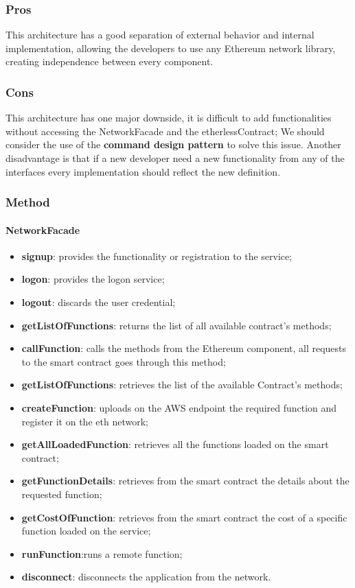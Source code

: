 \subsubsection{Pros}
This architecture has a good separation of external behavior and internal implementation,
allowing the developers to use any Ethereum network library, creating independence between every component.
\subsubsection{Cons}
This architecture has one major downside, it is difficult to add functionalities without accessing the NetworkFacade and the etherlessContract; We should consider the use of the \textbf{command design pattern} to solve this issue.
Another disadvantage is that if a new developer need a new functionality from any of the interfaces every implementation should reflect the new definition.
\subsubsection{Method}
\paragraph{NetworkFacade}
\begin{itemize}
    \item \textbf{signup}: provides the functionality or registration to the service;
    \item \textbf{logon}: provides the logon service; 
    \item \textbf{logout}: discards the user credential;
    \item \textbf{getListOfFunctions}: returns the list of all available contract's methods;
    \item \textbf{callFunction}: calls the methods from the Ethereum component, all requests to the smart contract goes through this method;
    \item \textbf{getListOfFunctions}: retrieves the list of the available Contract's methods;
    \item \textbf{createFunction}: uploads on the AWS endpoint the required function and register it on the eth network;
    \item \textbf{getAllLoadedFunction}: retrieves all the functions loaded on the smart contract;
    \item \textbf{getFunctionDetails}: retrieves from the smart contract the details about the requested function;
    \item \textbf{getCostOfFunction}: retrieves from the smart contract the cost of a specific function loaded on the service;
    \item \textbf{runFunction}:runs a remote function;
    \item \textbf{disconnect}: disconnects the application from the network.
\end{itemize}
